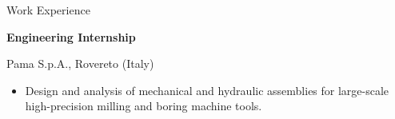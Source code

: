 \begin{rubric}{Work Experience}
\begin{itemize}
    \end{itemize}
%
\entry*[\begin{tabular}{r}
         02/2016 \\ 
         09/2015 \\  
         02/2015    
        \end{tabular}]
    \textbf{Engineering Internship} 
    \par Pama S.p.A., Rovereto (Italy)
    \vspace{-0.3cm}
    \begin{itemize}
        \item Design and analysis of mechanical and hydraulic assemblies for large-scale high-precision milling and boring machine tools.
    \end{itemize}
%
%
%
\end{rubric}
